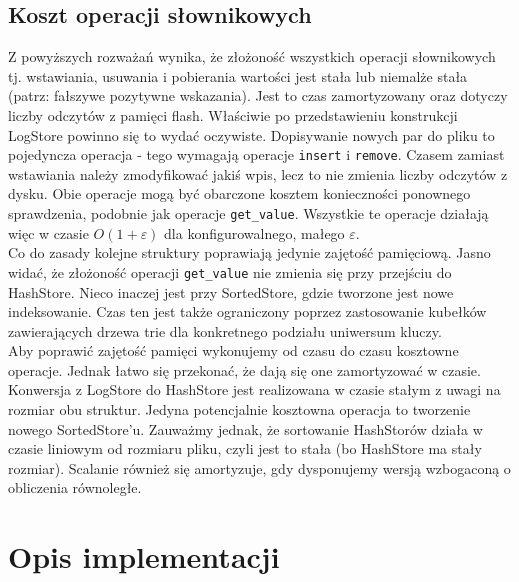\documentclass[declaration,shortabstract,masc]{iithesis}
\begin{document}
		\section{Koszt operacji słownikowych}
			Z powyższych rozważań wynika, że złożoność wszystkich operacji słownikowych tj. wstawiania, usuwania i pobierania wartości jest stała lub niemalże stała (patrz: fałszywe pozytywne wskazania). Jest to czas zamortyzowany oraz dotyczy liczby odczytów z pamięci flash. Właściwie po przedstawieniu konstrukcji LogStore powinno się to wydać oczywiste. Dopisywanie nowych par do pliku to pojedyncza operacja - tego wymagają operacje \texttt{insert} i \texttt{remove}. Czasem zamiast wstawiania należy zmodyfikować jakiś wpis, lecz to nie zmienia liczby odczytów z dysku. Obie operacje mogą być obarczone kosztem konieczności ponownego sprawdzenia, podobnie jak operacje \texttt{get\_value}. Wszystkie te operacje działają więc w czasie $O(1+\varepsilon)$ dla konfigurowalnego, małego $\varepsilon$.\\
			\indent Co do zasady kolejne struktury poprawiają jedynie zajętość pamięciową. Jasno widać, że złożoność operacji \texttt{get\_value} nie zmienia się przy przejściu do HashStore. Nieco inaczej jest przy SortedStore, gdzie tworzone jest nowe indeksowanie. Czas ten jest także ograniczony poprzez zastosowanie kubełków zawierających drzewa trie dla konkretnego podziału uniwersum kluczy.\\
			\indent Aby poprawić zajętość pamięci wykonujemy od czasu do czasu kosztowne operacje. Jednak łatwo się przekonać, że dają się one zamortyzować w czasie. Konwersja z LogStore do HashStore jest realizowana w czasie stałym z uwagi na rozmiar obu struktur. Jedyna potencjalnie kosztowna operacja to tworzenie nowego SortedStore'u. Zauważmy jednak, że sortowanie HashStorów działa w czasie liniowym od rozmiaru pliku, czyli jest to stała (bo HashStore ma stały rozmiar). Scalanie również się amortyzuje, gdy dysponujemy wersją wzbogaconą o obliczenia równoległe.
	\chapter{Opis implementacji}
\end{document}
